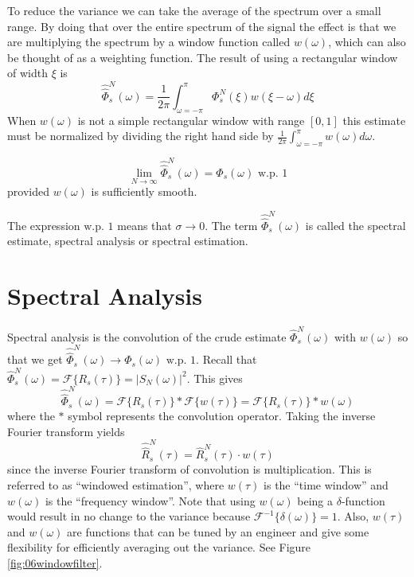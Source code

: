 \documentclass[lecture,12pt,]{pcms-l}
\theoremstyle{example}
\newcommand{\w}{\omega}
\begin{document}
To reduce the variance we can take the average of the spectrum over a small range. By doing that over the entire spectrum of the signal the effect is that we are multiplying the spectrum by a window function called $w(\w)$, which can also be thought of as a weighting function. The result of using a rectangular window of width $\xi$ is
$$\hat{\hat{\Phi}}_s^N(\w) = \frac{1}{2\pi}\int_{\w=-\pi}^\pi \Phi_s^N(\xi)w(\xi-\w)d\xi$$
When $w(\w)$ is not a simple rectangular window with range $[0,1]$ this estimate must be normalized by dividing the right hand side by $\frac{1}{2\pi}\int_{\w=-\pi}^\pi w(\w)d\w$.

\begin{theorem}
$$\lim_{N\to\infty}\hat{\hat{\Phi}}_s^N(\w) = \Phi_s(\w) \text{ w.p. } 1$$
provided $w(\w)$ is sufficiently smooth.
\end{theorem}
The expression $\text{w.p. } 1$ means that $\sigma\to 0$. The term $\hat{\hat{\Phi}}_s^N(\w)$ is called the spectral estimate, spectral analysis or spectral estimation.

\section{Spectral Analysis}
Spectral analysis is the convolution of the crude estimate $\hat{\Phi}_s^N(\w)$ with $w(\w)$ so that we get $\hat{\hat{\Phi}}_s^N(\w) \to \Phi_s(\w) \text{ w.p. } 1$. Recall that $\hat{\Phi}_s^N(\w) = \mathcal{F}\{R_s(\tau)\} = |S_N(\w)|^2$. This gives
$$\hat{\hat{\Phi}}_s^N(\w) = \mathcal{F}\{R_s(\tau)\} * \mathcal{F}\{w(\tau)\} = \mathcal{F}\{R_s(\tau)\} * w(\w)$$
where the $*$ symbol represents the convolution operator. Taking the inverse Fourier transform yields
$$\hat{\hat{R}}_s^N(\tau) = \hat{R}_s^N(\tau)\cdot w(\tau)$$
since the inverse Fourier transform of convolution is multiplication. This is referred to as ``windowed estimation'', where $w(\tau)$ is the ``time window'' and $w(\w)$ is the ``frequency window''. Note that using $w(\w)$ being a $\delta$-function would result in no change to the variance because $\mathcal{F}^{-1}\{\delta(\w)\} = 1$. Also, $w(\tau)$ and $w(\w)$ are functions that can be tuned by an engineer and give some flexibility for efficiently averaging out the variance. See Figure \ref{fig:06windowfilter}.
\end{document}
